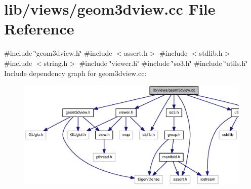 \section{lib/views/geom3dview.cc \-File \-Reference}
\label{geom3dview_8cc}
{\ttfamily \#include \char`\"{}geom3dview.\-h\char`\"{}}\*
{\ttfamily \#include $<$assert.\-h$>$}\*
{\ttfamily \#include $<$stdlib.\-h$>$}\*
{\ttfamily \#include $<$string.\-h$>$}\*
{\ttfamily \#include \char`\"{}viewer.\-h\char`\"{}}\*
{\ttfamily \#include \char`\"{}so3.\-h\char`\"{}}\*
{\ttfamily \#include \char`\"{}utils.\-h\char`\"{}}\*
\-Include dependency graph for geom3dview.\-cc\-:
\nopagebreak
\begin{figure}[H]
\begin{center}
\leavevmode
\includegraphics[width=350pt]{geom3dview_8cc__incl}
\end{center}
\end{figure}
